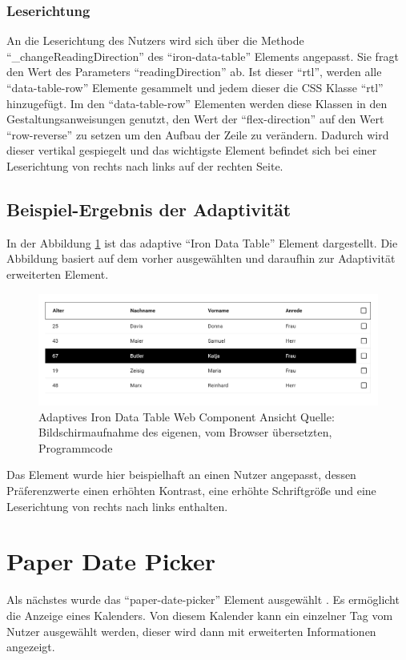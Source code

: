 \documentclass[12pt, paper=a4, bibtotoc, toc=listof, headsepline=true, numbers=endperiod]{scrreprt}
\begin{document}
	\subsubsection{Leserichtung}
	An die Leserichtung des Nutzers wird sich über die Methode \enquote{\_changeReadingDirection} des \enquote{iron-data-table} Elements angepasst. Sie fragt den Wert des Parameters \enquote{readingDirection} ab. Ist dieser \enquote{rtl}, werden alle \enquote{data-table-row} Elemente gesammelt und jedem dieser die CSS Klasse \enquote{rtl} hinzugefügt. Im den \enquote{data-table-row} Elementen werden diese Klassen in den Gestaltungsanweisungen genutzt, den Wert der \enquote{flex-direction} auf den Wert \enquote{row-reverse} zu setzen um den Aufbau der Zeile zu verändern. Dadurch wird dieser vertikal gespiegelt und das wichtigste Element befindet sich bei einer Leserichtung von rechts nach links auf der rechten Seite.
	\subsection{Beispiel-Ergebnis der Adaptivität}
	In der Abbildung \ref{img:datTabErg} ist das adaptive \enquote{Iron Data Table} Element  dargestellt. Die Abbildung basiert auf dem vorher ausgewählten und daraufhin zur Adaptivität erweiterten Element. 
	\begin{figure}[H]		
		\centering
		\includegraphics[width=\textwidth,height=\textheight,keepaspectratio]{datTabErg.png}
		\caption[Adaptiver Iron Data Table]{Adaptives Iron Data Table Web Component Ansicht Quelle: Bildschirmaufnahme des eigenen, vom Browser übersetzten, Programmcode}
		\label{img:datTabErg}
	\end{figure}\noindent
	Das Element wurde hier beispielhaft an einen Nutzer angepasst, dessen Präferenzwerte einen erhöhten Kontrast, eine erhöhte Schriftgröße und eine Leserichtung von rechts nach links enthalten. 
	\newpage	
	\section{Paper Date Picker}
	Als nächstes wurde das \enquote{paper-date-picker} Element ausgewählt \cite{datPic}. Es ermöglicht die Anzeige eines Kalenders. Von diesem Kalender kann ein einzelner Tag vom Nutzer ausgewählt werden, dieser wird dann mit erweiterten Informationen angezeigt.
\end{document}
